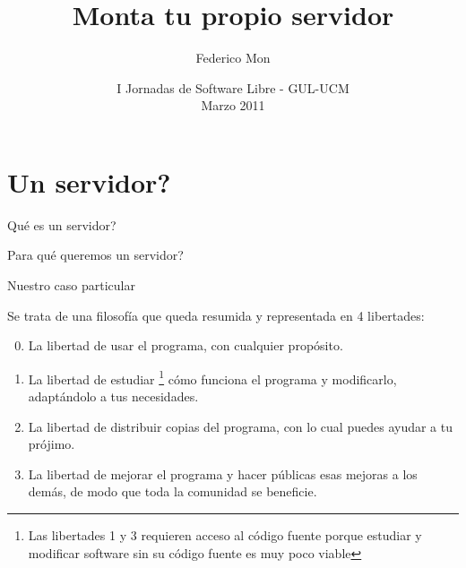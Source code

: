 \documentclass[spanish]{beamer}
\title[Monta tu propio servidor - GUL-UCM]
{Monta tu propio servidor
}
\author[\url{http://gulucm.org}]
{
Federico Mon
}
\institute{Facultad de Informática.\\Universidad Complutense de Madrid.}
\date{
I Jornadas de Software Libre - GUL-UCM\\
Marzo 2011}
\begin{document}
    \frame{\titlepage}
    \section{Un servidor?}
        \begin{frame}{Qué es un servidor?}
        
        \begin{frame}{Para qué queremos un servidor?}
        
	\begin{frame}{Nuestro caso particular}

        
        
        \end{frame}
        \begin{frame}{}
            Se trata de una filosofía que queda resumida y representada en 4 
            libertades:
            \begin{enumerate}
            \setcounter{enumi}{-1}
                \item La libertad de usar el programa, con cualquier propósito.
                \item La libertad de estudiar \footnote{Las libertades 1 y 3 
                requieren acceso al código fuente porque estudiar y modificar 
                software sin su código fuente es muy poco viable} cómo funciona 
                el programa y modificarlo, adaptándolo a tus necesidades.
                \item La libertad de distribuir copias del programa, con lo cual
                 puedes ayudar a tu prójimo.
                \item La libertad de mejorar el programa y hacer públicas esas 
                mejoras a los demás, de modo que toda la comunidad se beneficie.
            \end{enumerate}
        \end{frame}


\end{frame}
\end{frame}
\end{document}
